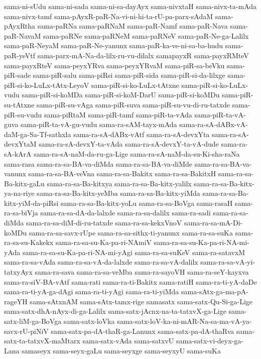 {sama-ni-sUdu
sama-ni-sada
sama-ni-sa-dayAyx
sama-nivxtaH
sama-nivx-ta-mAda
sama-nivx-tamf
sama-pAyxR-paR-Na-vi-ni-hi-ta-rU-pa-parx-sAdaM
sama-pAyxRtha
sama-paRNa
sama-paRNaM
sama-paR-Namf
sama-paR-Nava
sama-paR-NavaM
sama-paRNe
sama-paRNeM
sama-paRNeV
sama-paR-Ne-ga-Lalilx
sama-paR-NeyaM
sama-paR-Ne-yanunx
sama-paR-ka-ve-ni-sa-ba-hudu
sama-paR-yeVtf
sama-parx-mA-Na-da-lilx-ru-vu-dilalx
samapayxR
sama-payxRMteV
sama-payxRteV
sama-peyxYRva
sama-peyxYRvaM
sama-piR-sa-beVku
sama-piR-sade
sama-piR-salu
sama-piRsi
sama-piR-sida
sama-piR-si-da-lilxge
sama-piR-si-ko-LuLx-tAtx-LeyoV
sama-piR-si-ko-LuLx-tAtxne
sama-piR-si-ko-LuLx-vudu
sama-piR-si-koMDa
sama-piR-si-koM-DarU
sama-piR-si-koMDu
sama-piR-su-tAtxne
sama-piR-su-vAga
sama-piR-suva
sama-piR-su-vu-di-ru-tatxde
sama-piR-su-vudu
sama-piRtaM
sama-piR-tamf
sama-piR-ta-vAda
sama-piR-ta-vA-guva
sama-piR-ta-vA-gu-vudu
sama-ra-sAM-tayx-mAda
sama-ra-sA-dABx-vA-daM-ga-Sa-Tf-sathxla
sama-ra-sA-dABx-vAtf
sama-ra-sA-devxYta
sama-ra-sA-devxYtaM
sama-ra-sA-devxY-ta-vAda
sama-ra-sA-devxY-ta-vA-dude
sama-ra-sA-kArA
sama-ra-sA-naM-da-ru-ga-Lige
sama-ra-sA-naM-da-su-Ki-sha-raNa
sama-rasa
sama-ra-sa-BA-va-diMda
sama-ra-sa-BA-va-diMde
sama-ra-sa-BA-va-vanunx
sama-ra-sa-BA-veVna
sama-ra-sa-Bakitx
sama-ra-sa-BakitxH
sama-ra-sa-Ba-kitx-gaLu
sama-ra-sa-Ba-kitxya
sama-ra-sa-Ba-kitx-yalilx
sama-ra-sa-Ba-kitx-ya-na-riye
sama-ra-sa-Ba-kitx-yeMba
sama-ra-sa-Ba-kitx-yiMda
sama-ra-sa-Ba-kitx-yiM-da-piRsi
sama-ra-sa-Ba-kitx-yoLu
sama-ra-sa-BoVga
sama-rasaH
sama-ra-sa-biVja
sama-ra-sa-dA-da-lalxde
sama-ra-sa-dalilx
sama-ra-sadi
sama-ra-sa-diMda
sama-ra-sa-diM-di-ru-tatxde
sama-ra-sa-kekxVnoV
sama-ra-sa-mA-Di-koMDu
sama-ra-sa-savx-rUpe
sama-ra-sa-sithx-ti-yanunx
sama-ra-sa-suKa
sama-ra-sa-su-Kakekx
sama-ra-sa-su-Ka-pa-ri-NAmiV
sama-ra-sa-su-Ka-pa-ri-NA-mi-yAda
sama-ra-sa-su-Ka-pa-ri-NA-mi-yAgi
sama-ra-sa-suKeV
sama-ra-satavxM
sama-ra-sa-vAda
sama-ra-sa-vA-da-lalxde
sama-ra-sa-vA-dalilx
sama-ra-sa-vA-yi-tatxyAyx
sama-ra-sava
sama-ra-sa-veMba
sama-ra-sayoVH
sama-ra-seY-kayxva
sama-ra-siV-BA-vAtf
sama-rati
sama-ra-ti-Bakitx
sama-ratiH
sama-ra-ti-yA-daDe
sama-ra-ti-yA-ga-dAgi
sama-ra-ti-yAgi
sama-ra-ti-yiMda
sama-sAtx-ga-ma-pA-rageYH
sama-sAtxnAM
sama-sAtx-tamx-rige
samasatx
sama-satx-Qu-Si-ga-Lige
sama-satx-dhA-nAyx-di-ga-Lalilx
sama-satx-jAcnx-na-ta-tatxvX-ga-Lige
sama-satx-liM-ga-BoVga
sama-satx-loVka
sama-satx-loV-ka-ni-mAR-Na-sa-ma-vA-ya-savx-rU-piNiV
sama-satx-pa-dA-thaR-ga-Lanunx
sama-satx-pa-dA-thaRva
sama-satx-ta-tatxvX-maMtarx
sama-satx-vAda
sama-satxvU
sama-satx-vi-deyx-ga-Lana
samaseyx
sama-seyx-gaLu
sama-seyxge
sama-seyxyU
sama-suKa
}
